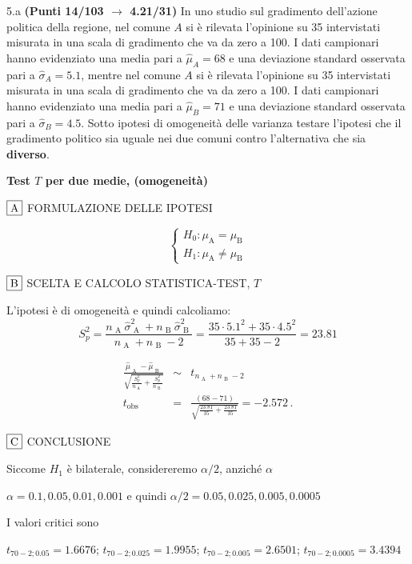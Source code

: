 \documentclass[
  11pt,
]{book}
\theoremstyle{mytheoremstyle}
\theoremstyle{mydefstyle}
\newenvironment{sol}
  {
  \begin{tcolorbox}[enhanced,breakable,arc=0.1mm,boxrule=1pt,colback=white,colframe=iblue,
  title=\bf \fontfamily{lmss}\selectfont \hspace{.5 cm} Soluzione,drop fuzzy shadow]

}{
\end{tcolorbox}
  }
\begin{document}
5.a \textbf{(Punti 14/103 \(\rightarrow\) 4.21/31)} In uno studio sul gradimento dell'azione politica della regione, nel comune \(A\) si è rilevata l'opinione su 35 intervistati misurata in una scala di gradimento che va da zero a 100. I dati campionari hanno evidenziato una media pari a \(\hat\mu_A=68\) e una deviazione standard osservata pari a \(\hat\sigma_A=5.1\), mentre nel comune \(A\) si è rilevata l'opinione su 35 intervistati misurata in una scala di gradimento che va da zero a 100. I dati campionari hanno evidenziato una media pari a \(\hat\mu_B=71\) e una deviazione standard osservata pari a \(\hat\sigma_B=4.5\). Sotto ipotesi di omogeneità delle varianza testare l'ipotesi che il gradimento politico sia uguale nei due comuni contro l'alternativa che sia \textbf{diverso}.

\begin{sol}
\textbf{Test \(T\) per due medie, (omogeneità)}

\(\fbox{A}\) FORMULAZIONE DELLE IPOTESI

\[\begin{cases}
   H_0: \mu_\text{A} = \mu_\text{B} \\
   H_1: \mu_\text{A} \neq \mu_\text{B} 
   \end{cases}\]

\(\fbox{B}\) SCELTA E CALCOLO STATISTICA-TEST, \(T\)

L'ipotesi è di omogeneità e quindi calcoliamo:\[
   S_p^2=\frac{n_\text{ A }\hat\sigma^2_\text{ A }+n_\text{ B }\hat\sigma^2_\text{ B }}{n_\text{ A }+n_\text{ B }-2} =
   \frac{ 35 \cdot 5.1 ^2+ 35 \cdot 4.5 ^2}{ 35 + 35 -2}= 23.81 
  \]

\begin{eqnarray*}
  \frac{\hat\mu_\text{ A } - \hat\mu_\text{ B }}
  {\sqrt{\frac {S^2_p}{n_\text{ A }}+\frac {S^2_p}{n_\text{ B }}}}&\sim&t_{n_\text{ A }+n_\text{ B }-2}\\
  t_{\text{obs}}
  &=& \frac{ ( 68 -  71 )} {\sqrt{\frac{ 23.81 }{ 35 }+\frac{ 23.81 }{ 35 }}}
  =   -2.572 \, .
  \end{eqnarray*}

\(\fbox{C}\) CONCLUSIONE

Siccome \(H_1\) è bilaterale, considereremo \(\alpha/2\),
anziché \(\alpha\)

\(\alpha=0.1, 0.05, 0.01, 0.001\) e quindi \(\alpha/2=0.05, 0.025, 0.005, 0.0005\)

I valori critici sono

\(t_{70-2;0.05}=1.6676\); \(t_{70-2;0.025}=1.9955\); \(t_{70-2;0.005}=2.6501\); \(t_{70-2;0.0005}=3.4394\)


\end{sol}
\end{document}
